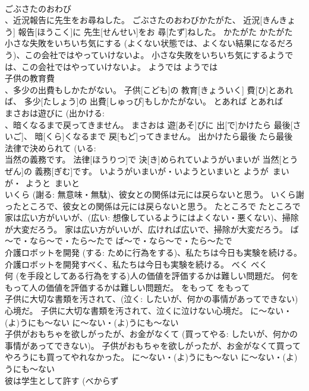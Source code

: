 \documentclass[8pt]{extreport}
\begin{document}
\begin{CJK}{UTF8}{min}
\\	ごぶさたのおわび 
\\	、近況報告に先生をお尋ねした。	ごぶさたのおわびかたがた、 近況[きんきょう] 報告[ほうこく]に 先生[せんせい]をお 尋[たず]ねした。	かたがた	かたがた	
\\	小さな失敗をいちいち気にする (よくない状態では、よくない結果になるだろう)、この会社ではやっていけないよ。	小さな失敗をいちいち気にするようでは、この会社ではやっていけないよ。	ようでは	ようでは	
\\	子供の教育費 
\\	、多少の出費もしかたがない。	子供[こども]の 教育[きょういく] 費[ひ]とあれば、 多少[たしょう]の 出費[しゅっぴ]もしかたがない。	とあれば	とあれば	
\\	まさおは遊びに (出かける: 
\\	、暗くなるまで戻ってきません。	まさおは 遊[あそ]びに 出[で]かけたら 最後[さいご]、 暗[くら]くなるまで 戻[もど]ってきません。	出かけたら最後	たら最後	
\\	法律で決められて (いる: 
\\	当然の義務です。	法律[ほうりつ]で 決[き]められていようがいまいが 当然[とうぜん]の 義務[ぎむ]です。	いようがいまいが・いようといまいと	ようが~まいが・~ようと~まいと	
\\	いくら (謝る: 無意味・無駄)、彼女との関係は元には戻らないと思う。	いくら謝ったところで、彼女との関係は元には戻らないと思う。	たところで	たところで	
\\	家は広い方がいいが、(広い: 想像しているようにはよくない・悪くない)、掃除が大変だろう。	家は広い方がいいが、広ければ広いで、掃除が大変だろう。	ば～で・なら～で・たら～たで	ば～で・なら～で・たら～たで	
\\	介護ロボットを開発 (する: ために行為をする)、私たちは今日も実験を続ける。	介護ロボットを開発すべく、私たちは今日も実験を続ける。	べく	べく	
\\	何 (を手段としてある行為をする)人の価値を評価するかは難しい問題だ。	何をもって人の価値を評価するかは難しい問題だ。	をもって	をもって	
\\	子供に大切な書類を汚されて、(泣く: したいが、何かの事情があってできない)心境だ。	子供に大切な書類を汚されて、泣くに泣けない心境だ。	に～ない・(よ)うにも～ない	に～ない・(よ)うにも～ない	
\\	子供がおもちゃを欲しがったが、お金がなくて (買ってやる: したいが、何かの事情があってできない)。	子供がおもちゃを欲しがったが、お金がなくて買ってやろうにも買ってやれなかった。	に～ない・(よ)うにも～ない	に～ない・(よ)うにも～ない	
\\	彼は学生として許す (べからず 

\end{CJK}
\end{document}
